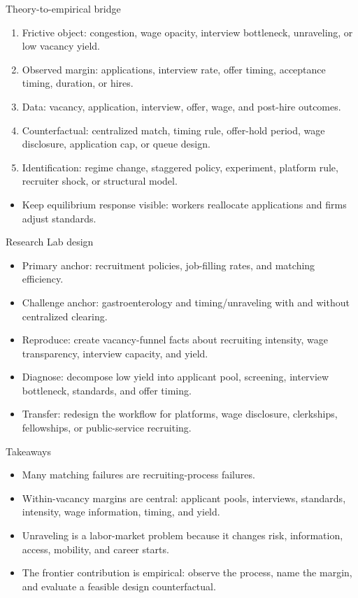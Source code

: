 \documentclass[aspectratio=169,11pt]{beamer}
\begin{document}
\begin{frame}{Theory-to-empirical bridge}
\small
\begin{enumerate}
    \item Frictive object: congestion, wage opacity, interview bottleneck, unraveling, or low vacancy yield.
    \item Observed margin: applications, interview rate, offer timing, acceptance timing, duration, or hires.
    \item Data: vacancy, application, interview, offer, wage, and post-hire outcomes.
    \item Counterfactual: centralized match, timing rule, offer-hold period, wage disclosure, application cap, or queue design.
    \item Identification: regime change, staggered policy, experiment, platform rule, recruiter shock, or structural model.
\end{enumerate}
\vspace{0.1cm}
\begin{itemize}
    \item Keep equilibrium response visible: workers reallocate applications and firms adjust standards.
\end{itemize}
\end{frame}

\begin{frame}{Research Lab design}
\begin{itemize}
    \item Primary anchor: recruitment policies, job-filling rates, and matching efficiency.
    \item Challenge anchor: gastroenterology and timing/unraveling with and without centralized clearing.
    \item Reproduce: create vacancy-funnel facts about recruiting intensity, wage transparency, interview capacity, and yield.
    \item Diagnose: decompose low yield into applicant pool, screening, interview bottleneck, standards, and offer timing.
    \item Transfer: redesign the workflow for platforms, wage disclosure, clerkships, fellowships, or public-service recruiting.
\end{itemize}
\end{frame}

\begin{frame}{Takeaways}
\begin{itemize}
    \item Many matching failures are recruiting-process failures.
    \item Within-vacancy margins are central: applicant pools, interviews, standards, intensity, wage information, timing, and yield.
    \item Unraveling is a labor-market problem because it changes risk, information, access, mobility, and career starts.
    \item The frontier contribution is empirical: observe the process, name the margin, and evaluate a feasible design counterfactual.
\end{itemize}
\end{frame}
\end{document}
